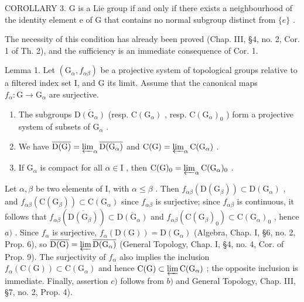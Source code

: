 COROLLARY 3. G is a Lie group if and only if there exists a neighbourhood of the identity element e of G that contains no normal subgroup distinct from \(\{e\}\) .

The necessity of this condition has already been proved (Chap. III, §4, no. 2, Cor. 1 of Th. 2), and the sufficiency is an immediate consequence of Cor. 1.


Lemma 1. Let \((\mathrm{G}_{\alpha}, f_{\alpha \beta})\) be a projective system of topological groups relative to a filtered index set I, and G its limit. Assume that the canonical maps \(f_{\alpha}: \mathrm{G} \to \mathrm{G}_{\alpha}\) are surjective.

\begin{enumerate}
\def\labelenumi{\alph{enumi})}
\item
  The subgroups \(\overline{\mathrm{D}(\mathrm{G}_{\alpha})}\) (resp. \(\mathrm{C}(\mathrm{G}_{\alpha})\) , resp. \(\mathrm{C}(\mathrm{G}_{\alpha})_0\) ) form a projective system of subsets of \(\mathrm{G}_{\alpha}\) .
\item
  We have \(\overline{\mathrm{D}(\mathrm{G})}=\varprojlim_{\alpha}\overline{\mathrm{D}(\mathrm{G}_{\alpha})}\) and \(\mathrm{C}(\mathrm{G})=\varprojlim_{\alpha}\mathrm{C}(\mathrm{G}_{\alpha})\) .
\item
  If \(\mathrm{G}_{\alpha}\) is compact for all \(\alpha \in \mathrm{I}\) , then \(\mathrm{C}(\mathrm{G})_0 = \varprojlim_{\alpha} \mathrm{C}(\mathrm{G}_{\alpha})_0\) .
\end{enumerate}

Let \(\alpha, \beta\) be two elements of I, with \(\alpha \leq \beta\) . Then \(f_{\alpha \beta}(\mathrm{D}(\mathrm{G}_{\beta})) \subset \mathrm{D}(\mathrm{G}_{\alpha})\) , and \(f_{\alpha \beta}(\mathrm{C}(\mathrm{G}_{\beta})) \subset \mathrm{C}(\mathrm{G}_{\alpha})\) since \(f_{\alpha \beta}\) is surjective; since \(f_{\alpha \beta}\) is continuous, it follows that \(f_{\alpha \beta}(\overline{\mathrm{D}(\mathrm{G}_{\beta})}) \subset \overline{\mathrm{D}(\mathrm{G}_{\alpha})}\) and \(f_{\alpha \beta}(\mathrm{C}(\mathrm{G}_{\beta})_0) \subset \mathrm{C}(\mathrm{G}_{\alpha})_0\) , hence \(a)\) . Since \(f_{\alpha}\) is surjective, \(f_{\alpha}(\mathrm{D}(\mathrm{G})) = \mathrm{D}(\mathrm{G}_{\alpha})\) (Algebra, Chap. I, §6, no. 2, Prop. 6), so \(\overline{\mathrm{D}(\mathrm{G})} = \varprojlim \overline{\mathrm{D}(\mathrm{G}_{\alpha})}\) (General Topology, Chap. I, §4, no. 4, Cor. of Prop. 9). The surjectivity of \(f_{\alpha}\) also implies the inclusion \(f_{\alpha}(\mathrm{C}(\mathrm{G})) \subset \mathrm{C}(\mathrm{G}_{\alpha})\) and hence \(\mathrm{C}(\mathrm{G}) \subset \varprojlim \mathrm{C}(\mathrm{G}_{\alpha})\) ; the opposite inclusion is immediate. Finally, assertion \(c)\) follows from \(b)\) and General Topology, Chap. III, §7, no. 2, Prop. 4).

